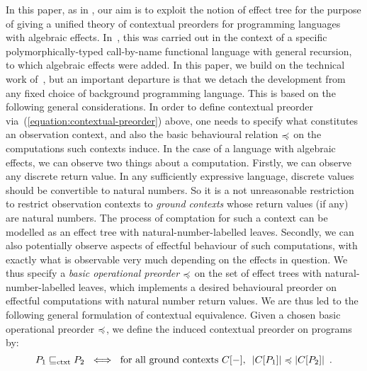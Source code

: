 In this paper, as in  \cite{gom}, our aim is to exploit the notion of effect tree for the purpose of 
giving a unified theory of contextual preorders for programming languages with algebraic effects.
In~\cite{gom}, this was carried out in the context of a specific polymorphically-typed call-by-name functional language with general recursion, to which algebraic effects were added. In this paper, we build on the technical work of~\cite{gom}, but an important departure is that we detach the development from any fixed choice of background programming language. This is based on the following general considerations. In order to define contextual preorder via~(\ref{equation:contextual-preorder}) above, one needs to specify what constitutes an observation context, and also the basic behavioural relation $\preccurlyeq$ on the computations such contexts induce. In the case of a language with algebraic effects, we can observe two things about a computation. Firstly, we can observe any discrete return value. 
In any sufficiently expressive language, discrete values should be convertible to natural numbers. So it is a not unreasonable  restriction to restrict observation contexts to \emph{ground contexts} whose return values (if any) are natural numbers.  The process of comptation for such a context can be  modelled as an effect tree with natural-number-labelled leaves.
Secondly, we can also potentially observe aspects of effectful behaviour of such  computations, with exactly what is observable very much depending on the effects in question. 
We thus specify a  \emph{basic operational preorder} 
$\preccurlyeq$ on the set
of effect trees with natural-number-labelled leaves, which implements a desired behavioural preorder on
effectful computations with natural number return values.
 We are thus 
led to the following general formulation of contextual equivalence. Given a chosen basic operational preorder
$\preccurlyeq$, we define the induced contextual preorder on programs by:
\begin{equation}
\label{equation:contextual-preorder-via-trees}
P_1 \sqsubseteq_\text{ctxt} P_2 ~ \iff ~
\text{for all ground contexts $C[-]$, $~ |C[P_1]| \preccurlyeq |C[P_2]|$} \enspace . 
\end{equation}

